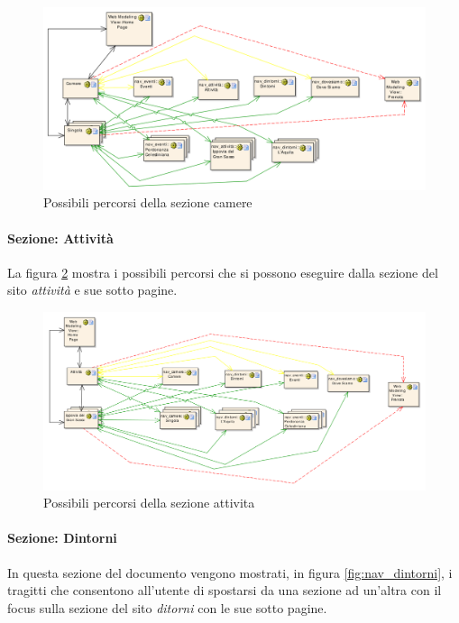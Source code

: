 \documentclass[a4paper,12pt,hidelinks]{report}
\begin{document}
\begin{figure}[h!]%
    \includegraphics[width=1.1\textwidth,keepaspectratio=true]{../img/nav_camere}
    \centering
    \caption{Possibili percorsi della sezione camere}%
    \label{fig:nav_camere}%
\end{figure}

\newpage
\paragraph{Sezione: Attività}
La figura \ref{fig:nav_attivita} mostra i possibili percorsi che si possono eseguire dalla sezione del sito \textit{attività} e sue sotto pagine.

\begin{figure}[h!]%
    \includegraphics[width=1.1\textwidth,keepaspectratio=true]{../img/nav_attivita}
    \centering
    \caption{Possibili percorsi della sezione attivita}%
    \label{fig:nav_attivita}%
\end{figure}

\newpage
\paragraph{Sezione: Dintorni}
In questa sezione del documento vengono mostrati, in figura \ref{fig:nav_dintorni}, i tragitti che consentono all'utente di spostarsi da una sezione ad un'altra con il focus 
sulla sezione del sito \textit{ditorni} con le sue sotto pagine.
\end{document}
